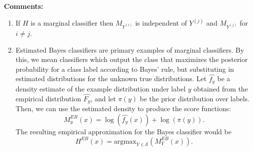 \documentclass[twoside,11pt]{article}
\begin{document}
\textbf{Comments:}
\begin{enumerate}
\item If $H$ is a marginal classifier then 
$M_{Y^{(i)}}$ is independent of $Y^{(j)}$ and $M_{Y^{(j)}}$ for $i \neq j$.
\item Estimated Bayes classifiers are primary examples of marginal
  classifiers. By this, we mean classifiers which output the class that maximizes the posterior probability for a class label according to Bayes' rule, but substituting in estimated distributions for the unknown true distributions. %
  Let $\hat{f_y}$ be a density estimate of the example
  distribution under label $y$ obtained from the empirical
  distribution $\hat{F_y}$, and let $\pi(y)$ be the prior distribution over labels. Then, we can use the estimated density to
  produce the score functions:
\[ M^{EB}_y(x) = \log(\hat{f_{y}}(x)) + \log(\pi(y)).\]
The resulting empirical approximation for the Bayes classifier would
be
\[ H^{EB}(x) = \text{argmax}_{Y \in \mathcal{S}}(M^{EB}_Y(x)).\]

\end{enumerate}
\end{document}
